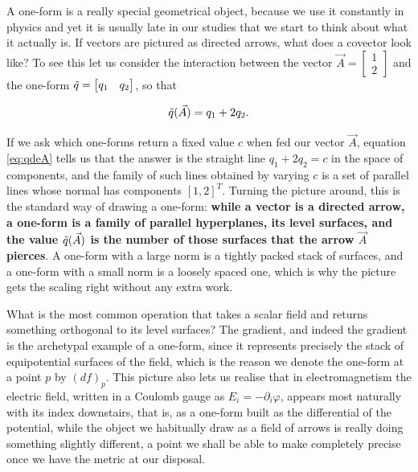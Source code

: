         A one-form is a really special geometrical object, because we use it constantly in physics and yet it is usually late in our studies that we start to think about what it actually is. If vectors are pictured as directed arrows, what does a covector look like? To see this let us consider the interaction between the vector $\Vec{A} = \begin{bmatrix}
            1\\
            2
        \end{bmatrix}$ and the one-form $\Tilde{q} = \begin{bmatrix} q_1 & q_2\end{bmatrix}$, so that

        \begin{equation}\label{eq:qdeA}
            \Tilde{q}(\Vec{A}) = q_1 + 2q_2.
        \end{equation}

        If we ask which one-forms return a fixed value $c$ when fed our vector $\vec{A}$, equation \ref{eq:qdeA} tells us that the answer is the straight line $q_1 + 2q_2 = c$ in the space of components, and the family of such lines obtained by varying $c$ is a set of parallel lines whose normal has components $[1,2]^T$. Turning the picture around, this is the standard way of drawing a one-form: \textbf{while a vector is a directed arrow, a one-form is a family of parallel hyperplanes, its level surfaces, and the value $\Tilde{q}(\Vec{A})$ is the number of those surfaces that the arrow $\Vec{A}$ pierces}. A one-form with a large norm is a tightly packed stack of surfaces, and a one-form with a small norm is a loosely spaced one, which is why the picture gets the scaling right without any extra work.

        What is the most common operation that takes a scalar field and returns something orthogonal to its level surfaces? The gradient, and indeed the gradient is the archetypal example of a one-form, since it represents precisely the stack of equipotential surfaces of the field, which is the reason we denote the one-form at a point $p$ by $(df)_p$. This picture also lets us realise that in electromagnetism the electric field, written in a Coulomb gauge as $E_i = -\partial_i \varphi$, appears most naturally with its index downstairs, that is, as a one-form built as the differential of the potential, while the object we habitually draw as a field of arrows is really doing something slightly different, a point we shall be able to make completely precise once we have the metric at our disposal.

